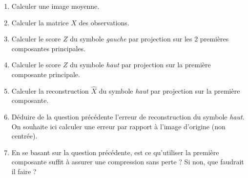 \documentclass[solutions]{../exercices}
\begin{document}
\begin{exercice}
		\begin{enumerate}
			\item Calculer une image moyenne.
			\item Calculer la matrice $X$ des observations.
			\item Calculer le score $Z$ du symbole \textit{gauche} par projection sur les 2 premières composantes principales.
			\item Calculer le score $Z$ du symbole \textit{haut} par projection sur la première composante principale.
			\item Calculer la reconstruction $\hat{X}$ du symbole \textit{haut} par projection sur la première composante.
			\item Déduire de la question précédente l'erreur de reconstruction du symbole \textit{haut}. On souhaite ici calculer une erreur par rapport à l'image d'origine (non centrée).
			\item En se basant sur la question précédente, est ce qu'utiliser la première composante suffit à assurer une compression sans perte ? Si non, que faudrait il faire ?
		\end{enumerate}		
	\end{exercice}
	
\end{document}
